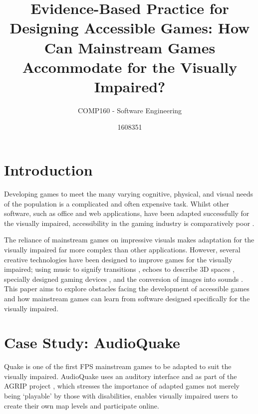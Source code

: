 \documentclass{scrartcl}
\title{Evidence-Based Practice for Designing Accessible Games: How Can Mainstream Games Accommodate for the Visually Impaired?}
\subtitle{COMP160 - Software Engineering}
\author{1608351}
\begin{document}
\maketitle


\section{Introduction}

{Developing games to meet the many varying cognitive, physical, and visual needs of the population is a complicated and often expensive task. Whilst other software, such as office and web applications, have been adapted successfully for the visually impaired, accessibility in the gaming industry is comparatively poor \cite{13}.

The reliance of mainstream games on impressive visuals makes adaptation for the visually impaired far more complex than other applications. However, several creative technologies have been designed to improve games for the visually impaired; using music to signify transitions \cite{1}, echoes to describe 3D spaces \cite{5}, specially designed gaming devices \cite{2} \cite{8}, and the conversion of images into sounds \cite{9}. This paper aims to explore obstacles facing the development of accessible games and how mainstream games can learn from software designed specifically for the visually impaired.}

\section{Case Study: AudioQuake}

Quake \cite{4} is one of the first FPS mainstream games to be adapted to suit the visually impaired. AudioQuake uses an auditory interface \cite{5} and as part of the AGRIP project \cite{6}, which stresses the importance of adapted games not merely being ‘playable’ by those with disabilities, enables visually impaired users to create their own map levels and participate online. 
\end{document}
